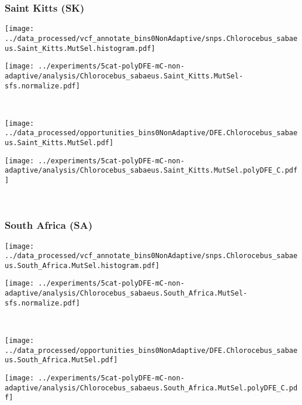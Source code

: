 \subsubsection{Saint Kitts (SK)}

\begin{minipage}{0.49\linewidth}
    \texttt{[image: ../data\_processed/vcf\_annotate\_bins0NonAdaptive/snps.Chlorocebus\_sabaeus.Saint\_Kitts.MutSel.histogram.pdf]}
\end{minipage}
\begin{minipage}{0.49\linewidth}
    \texttt{[image: ../experiments/5cat-polyDFE-mC-non-adaptive/analysis/Chlorocebus\_sabaeus.Saint\_Kitts.MutSel-sfs.normalize.pdf]}
\end{minipage}
\\
\begin{minipage}{0.49\linewidth}
    \texttt{[image: ../data\_processed/opportunities\_bins0NonAdaptive/DFE.Chlorocebus\_sabaeus.Saint\_Kitts.MutSel.pdf]}
\end{minipage}
\begin{minipage}{0.49\linewidth}
    \texttt{[image: ../experiments/5cat-polyDFE-mC-non-adaptive/analysis/Chlorocebus\_sabaeus.Saint\_Kitts.MutSel.polyDFE\_C.pdf]}
\end{minipage}
\\

\subsubsection{South Africa (SA)}

\begin{minipage}{0.49\linewidth}
    \texttt{[image: ../data\_processed/vcf\_annotate\_bins0NonAdaptive/snps.Chlorocebus\_sabaeus.South\_Africa.MutSel.histogram.pdf]}
\end{minipage}
\begin{minipage}{0.49\linewidth}
    \texttt{[image: ../experiments/5cat-polyDFE-mC-non-adaptive/analysis/Chlorocebus\_sabaeus.South\_Africa.MutSel-sfs.normalize.pdf]}
\end{minipage}
\\
\begin{minipage}{0.49\linewidth}
    \texttt{[image: ../data\_processed/opportunities\_bins0NonAdaptive/DFE.Chlorocebus\_sabaeus.South\_Africa.MutSel.pdf]}
\end{minipage}
\begin{minipage}{0.49\linewidth}
    \texttt{[image: ../experiments/5cat-polyDFE-mC-non-adaptive/analysis/Chlorocebus\_sabaeus.South\_Africa.MutSel.polyDFE\_C.pdf]}
\end{minipage}
\\

